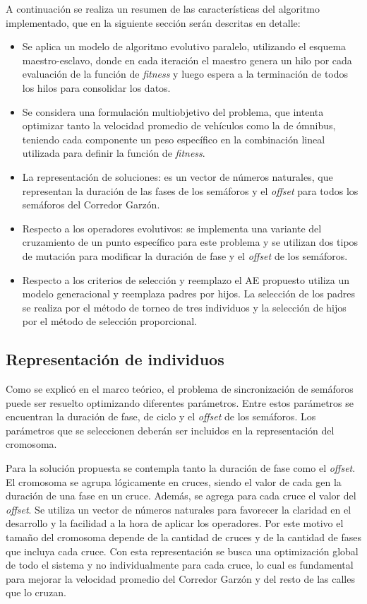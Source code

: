 A continuación se realiza un resumen de las características del algoritmo implementado, que en la siguiente sección serán descritas en detalle:
\begin{itemize}
	
	\item Se aplica un modelo de algoritmo evolutivo paralelo, utilizando el esquema maestro-esclavo, donde en cada iteración el maestro genera un hilo por cada evaluación de la función de \emph{fitness} y luego espera a la terminación de todos los hilos para consolidar los datos. 
	\item Se considera una formulación multiobjetivo del problema, que intenta optimizar tanto la velocidad promedio de vehículos como la de ómnibus, teniendo cada componente un peso específico en la combinación lineal utilizada para definir la función de \emph{fitness}.
	\item La representación de soluciones: es un vector de números naturales, que representan la duración de las fases de los semáforos y el \emph{offset} para todos los semáforos del Corredor Garzón.
	\item Respecto a los operadores evolutivos: se implementa una variante del cruzamiento de un punto específico para este problema y se utilizan dos tipos de mutación para modificar la duración de fase y el \emph{offset} de los semáforos.
	\item Respecto a los criterios de selección y reemplazo el AE propuesto utiliza un modelo generacional y reemplaza padres por hijos. La selección de los padres se realiza por el método de torneo de tres individuos y la selección de hijos por el método de selección proporcional.
	
\end{itemize}

\subsection{Representación de individuos}

Como se explicó en el marco teórico, el problema de sincronización de semáforos puede ser resuelto optimizando diferentes parámetros. Entre estos parámetros se encuentran la duración de fase, de ciclo y el \emph{offset} de los semáforos. Los parámetros que se seleccionen deberán ser incluidos en la representación del cromosoma.

Para la solución propuesta se contempla tanto la duración de fase como el \emph{offset}. El cromosoma se agrupa lógicamente en cruces, siendo el valor de cada gen la duración de una
fase en un cruce. Además, se agrega para cada cruce el valor del \emph{offset}. Se utiliza un vector de números naturales para favorecer la claridad en el desarrollo y la facilidad a la hora de aplicar los operadores. Por este motivo el tamaño del cromosoma depende de la cantidad de cruces y de la cantidad de fases que incluya cada cruce. Con esta representación se busca una optimización global de todo el sistema y no individualmente para cada cruce, lo cual es fundamental para mejorar la velocidad promedio del Corredor Garzón y del resto de las calles que lo cruzan.

